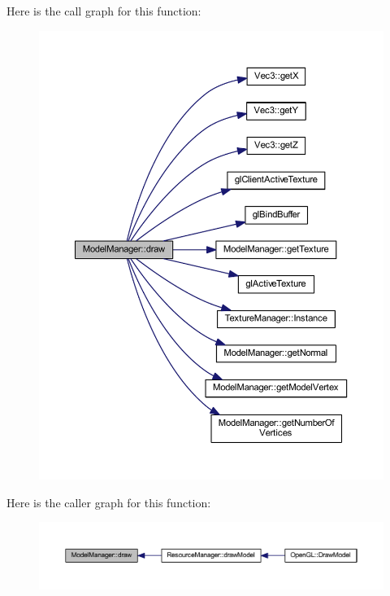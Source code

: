 Here is the call graph for this function\+:\nopagebreak
\begin{figure}[H]
\begin{center}
\leavevmode
\includegraphics[width=350pt]{d3/d3a/class_model_manager_a5da488f1d7e4038152d357496fd5282b_cgraph}
\end{center}
\end{figure}




Here is the caller graph for this function\+:\nopagebreak
\begin{figure}[H]
\begin{center}
\leavevmode
\includegraphics[width=350pt]{d3/d3a/class_model_manager_a5da488f1d7e4038152d357496fd5282b_icgraph}
\end{center}
\end{figure}


